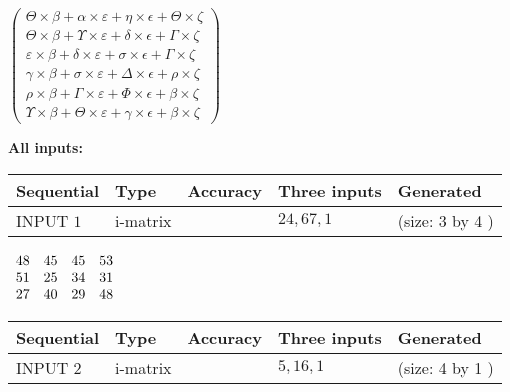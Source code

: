 \documentclass[12pt]{article}
\begin{document}
   
 $  \left( \begin{array}
 {
 c
 }
  \Theta \times  \beta +  \alpha \times  \varepsilon +  \eta \times  \epsilon +  \Theta \times                     \zeta \\ 
  \Theta \times  \beta +  \Upsilon \times  \varepsilon +  \delta \times  \epsilon +  \Gamma \times                     \zeta \\ 
  \varepsilon \times  \beta +  \delta \times  \varepsilon +  \sigma \times  \epsilon +  \Gamma \times                     \zeta \\ 
  \gamma \times  \beta +  \sigma \times  \varepsilon +  \Delta \times  \epsilon +  \rho \times                     \zeta \\ 
  \rho \times  \beta +  \Gamma \times  \varepsilon +  \Phi \times  \epsilon +  \beta \times                     \zeta \\ 
  \Upsilon \times  \beta +  \Theta \times  \varepsilon +  \gamma \times  \epsilon +  \beta \times                     \zeta
 \end{array} \right) $ 
   
   
\noindent\vspace{0.1in}\hspace{-0.08in} {\textbf{\Large{All inputs: }}}
   
   
  
  
\noindent\begin{tabular}{|l|l|l|l|l|}
\hline
 Sequential & Type & Accuracy & Three inputs & Generated \\ 
\hline
 
 
  INPUT $            1 $ & i-matrix &  & $
 24
 , 
 67
 , 
 1
 $ & (size:            3  by            4 )
 \\  \hline  
 \end{tabular}
   
   
 $\begin{array}{
 c
 c
 c
 c
 }
          48  & 
          45  & 
          45  & 
          53  \\ 
          51  & 
          25  & 
          34  & 
          31  \\ 
          27  & 
          40  & 
          29  & 
          48
\end{array}  $ 
  
  
\noindent\begin{tabular}{|l|l|l|l|l|}
\hline
 Sequential & Type & Accuracy & Three inputs & Generated \\ 
\hline
 
 
  INPUT $            2 $ & i-matrix &  & $
 5
 , 
 16
 , 
 1
 $ & (size:            4  by            1 )
 \\  \hline  
 \end{tabular}
   
\end{document}
